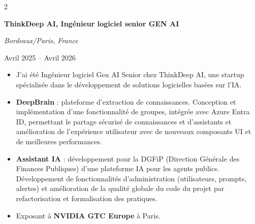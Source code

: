 \documentclass[10pt, letterpaper]{article}
\newenvironment{highlights}{
    \begin{itemize}[
        topsep=0.10 cm,
        parsep=0.10 cm,
        partopsep=0pt,
        itemsep=0pt,
        leftmargin=0.4 cm + 10pt
    ]
}{
    \end{itemize}
} %
\newenvironment{twocolentry}[2][]{
    \onecolentry
    \def\secondColumn{#2}
    \setcolumnwidth{\fill, 6 cm}
    \begin{paracol}{2}
}{
    \switchcolumn \raggedleft \secondColumn
    \end{paracol}
    \endonecolentry
} %
\begin{document}
        \vspace{0.2 cm}

        \begin{twocolentry}{\color{secondaryColor}Avril 2025 – Avril 2026}
            \textbf{ThinkDeep AI, Ingénieur logiciel senior GEN AI}

            \textit{Bordeaux/Paris, France}
        \end{twocolentry}
        
        \begin{highlights}
                \item J'ai été Ingénieur logiciel Gen AI Senior chez ThinkDeep AI, une startup spécialisée dans le développement de solutions logicielles basées sur l'IA.

                \item \textbf{DeepBrain} : plateforme d'extraction de connaissances. Conception et implémentation d'une fonctionnalité de groupes, intégrée avec Azure Entra ID, permettant le partage sécurisé de connaissances et d'assistants et amélioration de l'expérience utilisateur avec de nouveaux composants UI et de meilleures performances.

                \item \textbf{Assistant IA} : développement pour la DGFiP (Direction Générale des Finances Publiques) d'une plateforme IA pour les agents publics. Développement de fonctionnalités d'administration (utilisateurs, prompts, alertes) et amélioration de la qualité globale du code du projet par refactorisation et formalisation des pratiques.

                \item Exposant à \textbf{NVIDIA GTC Europe} à Paris.
        \end{highlights}

        \vspace{0.2 cm}
        
\end{document}

